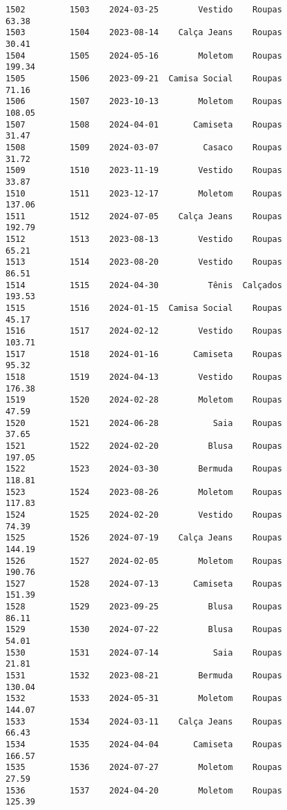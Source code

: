 \documentclass[11pt]{article}
\begin{document}
\begin{Verbatim}[commandchars=\\\{\}]
1502         1503    2024-03-25        Vestido    Roupas           63.38   
1503         1504    2023-08-14    Calça Jeans    Roupas           30.41   
1504         1505    2024-05-16        Moletom    Roupas          199.34   
1505         1506    2023-09-21  Camisa Social    Roupas           71.16   
1506         1507    2023-10-13        Moletom    Roupas          108.05   
1507         1508    2024-04-01       Camiseta    Roupas           31.47   
1508         1509    2024-03-07         Casaco    Roupas           31.72   
1509         1510    2023-11-19        Vestido    Roupas           33.87   
1510         1511    2023-12-17        Moletom    Roupas          137.06   
1511         1512    2024-07-05    Calça Jeans    Roupas          192.79   
1512         1513    2023-08-13        Vestido    Roupas           65.21   
1513         1514    2023-08-20        Vestido    Roupas           86.51   
1514         1515    2024-04-30          Tênis  Calçados          193.53   
1515         1516    2024-01-15  Camisa Social    Roupas           45.17   
1516         1517    2024-02-12        Vestido    Roupas          103.71   
1517         1518    2024-01-16       Camiseta    Roupas           95.32   
1518         1519    2024-04-13        Vestido    Roupas          176.38   
1519         1520    2024-02-28        Moletom    Roupas           47.59   
1520         1521    2024-06-28           Saia    Roupas           37.65   
1521         1522    2024-02-20          Blusa    Roupas          197.05   
1522         1523    2024-03-30        Bermuda    Roupas          118.81   
1523         1524    2023-08-26        Moletom    Roupas          117.83   
1524         1525    2024-02-20        Vestido    Roupas           74.39   
1525         1526    2024-07-19    Calça Jeans    Roupas          144.19   
1526         1527    2024-02-05        Moletom    Roupas          190.76   
1527         1528    2024-07-13       Camiseta    Roupas          151.39   
1528         1529    2023-09-25          Blusa    Roupas           86.11   
1529         1530    2024-07-22          Blusa    Roupas           54.01   
1530         1531    2024-07-14           Saia    Roupas           21.81   
1531         1532    2023-08-21        Bermuda    Roupas          130.04   
1532         1533    2024-05-31        Moletom    Roupas          144.07   
1533         1534    2024-03-11    Calça Jeans    Roupas           66.43   
1534         1535    2024-04-04       Camiseta    Roupas          166.57   
1535         1536    2024-07-27        Moletom    Roupas           27.59   
1536         1537    2024-04-20        Moletom    Roupas          125.39   

\end{Verbatim}
\end{document}
